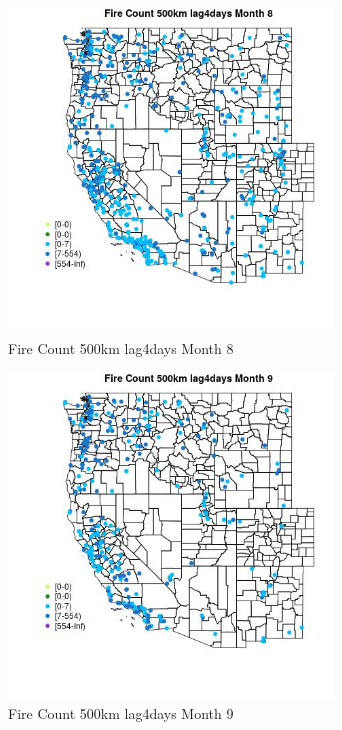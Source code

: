 \begin{figure} 
\centering  
\includegraphics[width=0.77\textwidth]{Code_Outputs/Report_ML_input_PM25_Step4_part_e_de_duplicated_aves_compiled_2019-05-18wNAs_MapObsMo8Fire_Count_500km_lag4days.jpg} 
\caption{\label{fig:Report_ML_input_PM25_Step4_part_e_de_duplicated_aves_compiled_2019-05-18wNAsMapObsMo8Fire_Count_500km_lag4days}Fire Count 500km lag4days Month 8} 
\end{figure} 
 

\begin{figure} 
\centering  
\includegraphics[width=0.77\textwidth]{Code_Outputs/Report_ML_input_PM25_Step4_part_e_de_duplicated_aves_compiled_2019-05-18wNAs_MapObsMo9Fire_Count_500km_lag4days.jpg} 
\caption{\label{fig:Report_ML_input_PM25_Step4_part_e_de_duplicated_aves_compiled_2019-05-18wNAsMapObsMo9Fire_Count_500km_lag4days}Fire Count 500km lag4days Month 9} 
\end{figure} 
 

